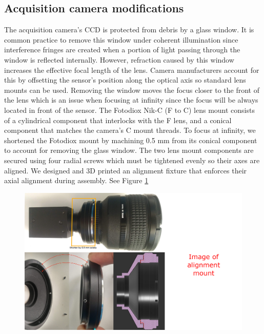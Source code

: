\subsection{Acquisition camera modifications}
The acquisition camera's CCD is protected from debris by a glass window. It is common practice to remove this window under coherent illumination since interference fringes are created when a portion of light passing through the window is reflected internally. However, refraction caused by this window increases the effective focal length of the lens. Camera manufacturers account for this by offsetting the sensor's position along the optical axis so standard lens mounts can be used. Removing the window moves the focus closer to the front of the lens which is an issue when focusing at infinity since the focus will be always located in front of the sensor. The Fotodiox Nik-C (F to C) lens mount consists of a cylindrical component that interlocks with the F lens, and a conical component that matches the camera's C mount threads. To focus at infinity, we shortened the Fotodiox mount by machining 0.5 mm from its conical component to account for removing the glass window. The two lens mount components are secured using four radial screws which must be tightened evenly so their axes are aligned. We designed and 3D printed an alignment fixture that enforces their axial alignment during assembly. See Figure \ref{fig:fotodiox_custom}

\begin{figure}
    \centering
    \includegraphics[width=\linewidth]{../figures/F-to-C_mount2.png}
    \caption{}
    \label{fig:fotodiox_custom}
\end{figure}

